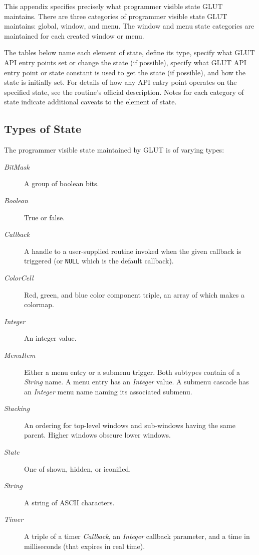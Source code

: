 
This appendix specifies precisely what programmer visible state GLUT
maintains.  There are three categories of programmer visible state GLUT
maintains:  global, window, and menu.  The window and menu state categories
are maintained for each created window or menu.

The tables below name each element of state, define its type, specify
what GLUT API entry points set or change the state (if possible), specify what GLUT API
entry point or  state constant is used to get the state (if possible),
and how the state is initially set.  For details of how any API entry point
operates on the specified state, see the routine's official description.
Notes for each category of state indicate additional caveats to the element
of state.

\subsection{Types of State}

The programmer visible state maintained by GLUT is of varying types:
\begin{description}

\item[\em BitMask]
A group of boolean bits.

\item[\em Boolean]
True or false.

\item[\em Callback]
A handle to a user-supplied routine invoked when the given callback is triggered
(or {\tt NULL} which is the default callback).

\item[\em ColorCell]
Red, green, and blue color component triple, an array of which makes
a colormap.

\item[\em Integer]
An integer value.

\item[\em MenuItem]
Either a menu entry or a submenu trigger.  Both subtypes contain
of a {\em String} name.  A menu entry has an {\em Integer} value.  A
submenu cascade has an {\em Integer} menu name naming its associated submenu.

\item[\em Stacking]
An ordering for top-level windows and sub-windows having the same
parent.  Higher windows obscure lower windows.

\item[\em State]
One of shown, hidden, or iconified.

\item[\em String]
A string of ASCII characters.

\item[\em Timer]
A triple of a timer {\em Callback}, an {\em Integer} callback parameter, and a time
in milliseconds (that expires in real time).

\end{description}

